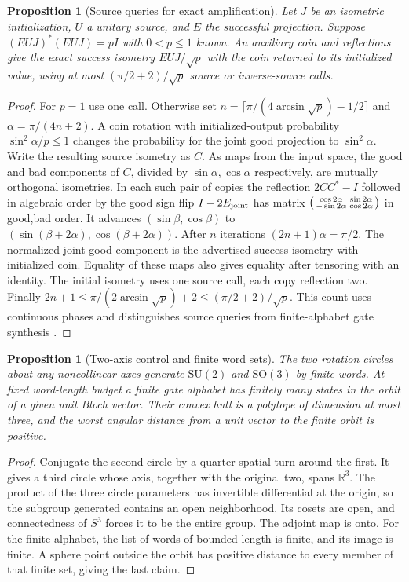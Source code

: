 \documentclass[11pt,reqno]{amsart}
\newtheorem{proposition}[theorem]{Proposition}
\theoremstyle{definition}
\theoremstyle{remark}
\numberwithin{equation}{section}
\newcommand{\R}{\mathbb{R}}
\newcommand{\SU}{\mathrm{SU}}
\newcommand{\SO}{\mathrm{SO}}
\begin{document}
\begin{proposition}[Source queries for exact amplification]\label{m4:amplify}
Let $J$ be an isometric initialization, $U$ a unitary source, and $E$ the successful projection. Suppose $(EUJ)^*(EUJ)=pI$ with $0<p\le1$ known. An auxiliary coin and reflections give the exact success isometry $EUJ/\sqrt p$ with the coin returned to its initialized value, using at most $(\pi/2+2)/\sqrt p$ source or inverse-source calls.
\end{proposition}
\begin{proof}
For $p=1$ use one call. Otherwise set $n=\lceil\pi/(4\arcsin\sqrt p)-1/2\rceil$ and $\alpha=\pi/(4n+2)$. A coin rotation with initialized-output probability $\sin^2\alpha/p\le1$ changes the probability for the joint good projection to $\sin^2\alpha$. Write the resulting source isometry as $C$. As maps from the input space, the good and bad components of $C$, divided by $\sin\alpha,\cos\alpha$ respectively, are mutually orthogonal isometries. In each such pair of copies the reflection $2CC^*-I$ followed in algebraic order by the good sign flip $I-2E_{\rm joint}$ has matrix $\begin{psmallmatrix}\cos 2\alpha&\sin 2\alpha\\-\sin 2\alpha&\cos 2\alpha\end{psmallmatrix}$ in good,bad order. It advances $(\sin\beta,\cos\beta)$ to $(\sin(\beta+2\alpha),\cos(\beta+2\alpha))$. After $n$ iterations $(2n+1)\alpha=\pi/2$. The normalized joint good component is the advertised success isometry with initialized coin. Equality of these maps also gives equality after tensoring with an identity. The initial isometry uses one source call, each copy reflection two. Finally $2n+1\le\pi/(2\arcsin\sqrt p)+2\le(\pi/2+2)/\sqrt p$. This count uses continuous phases and distinguishes source queries from finite-alphabet gate synthesis \cite{m4:BHMT,d4-dawson}.
\end{proof}


\begin{proposition}[Two-axis control and finite word sets]\label{m4:axes}
The two rotation circles about any noncollinear axes generate $\SU(2)$ and $\SO(3)$ by finite words. At fixed word-length budget a finite gate alphabet has finitely many states in the orbit of a given unit Bloch vector. Their convex hull is a polytope of dimension at most three, and the worst angular distance from a unit vector to the finite orbit is positive.
\end{proposition}
\begin{proof}
Conjugate the second circle by a quarter spatial turn around the first. It gives a third circle whose axis, together with the original two, spans $\R^3$. The product of the three circle parameters has invertible differential at the origin, so the subgroup generated contains an open neighborhood. Its cosets are open, and connectedness of $S^3$ forces it to be the entire group. The adjoint map is onto. For the finite alphabet, the list of words of bounded length is finite, and its image is finite. A sphere point outside the orbit has positive distance to every member of that finite set, giving the last claim.
\end{proof}
\end{document}
